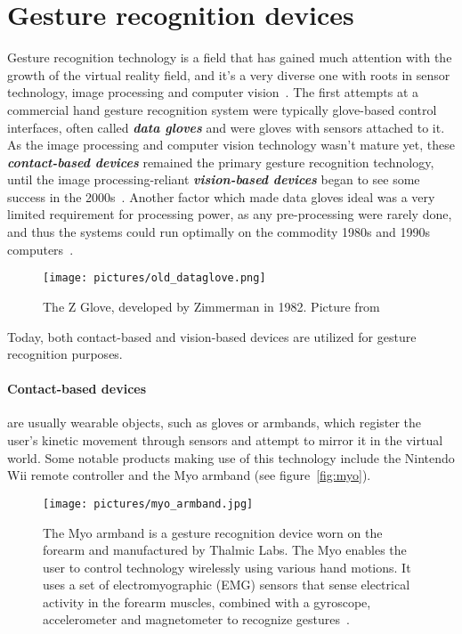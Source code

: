 \section{Gesture recognition devices}
Gesture recognition technology is a field that has gained much attention with the growth of the virtual reality field, 
and it's a very diverse one with roots in sensor technology, image processing and computer vision~\citep{Vafadar2014}. 
The first attempts at a commercial hand gesture recognition system were typically glove-based control interfaces, often called \textbf{\textit{data gloves}} 
and were gloves with sensors attached to it. As the image processing and computer vision technology wasn't mature yet, these \textbf{\textit{contact-based devices}} remained 
the primary gesture recognition technology, until the image processing-reliant \textbf{\textit{vision-based devices}} began to see some success in the 2000s~\citep{Premaratne2014}.
Another factor which made data gloves ideal was a very limited requirement for processing power, as any pre-processing were rarely done, 
and thus the systems could run optimally on the commodity 1980s and 1990s computers~\citep{Premaratne2014}.  

\begin{figure}%
	\texttt{[image: pictures/old\_dataglove.png]}
	\caption[The Z Glove]{The Z Glove, developed by Zimmerman in 1982. Picture from \citet{Premaratne2014}}
	\label{fig:old_dataglove}
\end{figure} 

Today, both contact-based and vision-based devices are utilized for gesture recognition purposes. 

\paragraph{Contact-based devices} are usually wearable objects, such as gloves or armbands, 
which register the user's kinetic movement through sensors and attempt to mirror it in the virtual world. 
Some notable products making use of this technology include the Nintendo Wii remote controller and the Myo armband (see figure~\vref{fig:myo}). 

\begin{figure}%
	\texttt{[image: pictures/myo\_armband.jpg]}
	\caption[The Myo armband]{The Myo armband is a gesture recognition device worn on the forearm and manufactured by Thalmic Labs. 
	The Myo enables the user to control technology wirelessly using various hand motions. 
	It uses a set of electromyographic (EMG) sensors that sense electrical activity in the forearm muscles, combined with a gyroscope, 
	accelerometer and magnetometer to recognize gestures~\citep{Myo2015}.}
	\label{fig:myo}
\end{figure}


